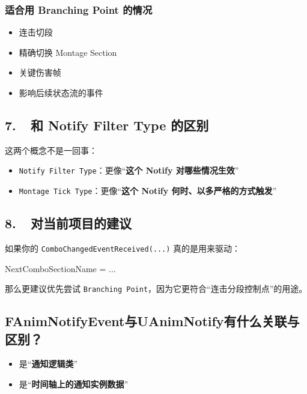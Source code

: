 \subsubsection*{适合用 Branching Point 的情况}
\begin{itemize}
	\item 连击切段
	\item 精确切换 Montage Section
	\item 关键伤害帧
	\item 影响后续状态流的事件
\end{itemize}

\subsection*{7.\ \ 和 Notify Filter Type 的区别}

这两个概念不是一回事：

\begin{itemize}
	\item \texttt{Notify Filter Type}：更像“\textbf{这个 Notify 对哪些情况生效}”
	\item \texttt{Montage Tick Type}：更像“\textbf{这个 Notify 何时、以多严格的方式触发}”
\end{itemize}

\subsection*{8.\ \ 对当前项目的建议}

如果你的 \texttt{ComboChangedEventReceived(...)} 真的是用来驱动：

\begin{code}
	NextComboSectionName = ...
\end{code}

那么更建议优先尝试 \texttt{Branching Point}，因为它更符合“连击分段控制点”的用途。




\subsection{FAnimNotifyEvent与UAnimNotify有什么关联与区别？}

\begin{itemize}
	\item {} 是“\textbf{通知逻辑类}”
	\item {} 是“\textbf{时间轴上的通知实例数据}”
\end{itemize}

